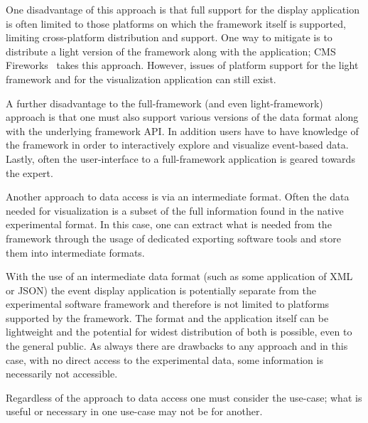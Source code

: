 \documentclass[12pt,a4paper]{article}
\begin{document}
One disadvantage of this approach is that full support for the display application is often limited to those platforms
on which the framework itself is supported, limiting cross-platform distribution and support.
One way to mitigate is to distribute a light version of the framework along with the application; CMS Fireworks~\cite{CMSFireworks}
takes this approach. However, issues of platform support for the light framework and for the visualization application can still exist.

A further disadvantage to the full-framework (and even light-framework) approach is that one must also support various versions of
the data format along with the underlying framework API. In addition users have to have knowledge of the framework in order to interactively
explore and visualize event-based data. Lastly, often the user-interface to a
full-framework application is geared towards the expert.

Another approach to data access is via an intermediate format. Often the data needed for visualization is a subset of the
full information found in the native experimental format. In this case, one can extract what is needed from the framework
through the usage of dedicated exporting software tools and store them
into intermediate formats.

With the use of an intermediate data format (such as some application of XML or JSON) the event display application
is potentially separate from the experimental software framework and therefore is not limited to platforms supported
by the framework. The format and the application itself can be lightweight and the potential for widest distribution
of both is possible, even to the general public. As always there are drawbacks to any approach and in this case, with no
direct access to the experimental data, some information is necessarily not accessible.

Regardless of the approach to data access one must consider the use-case; what is useful or necessary in one use-case may not
be for another.

\end{document}
